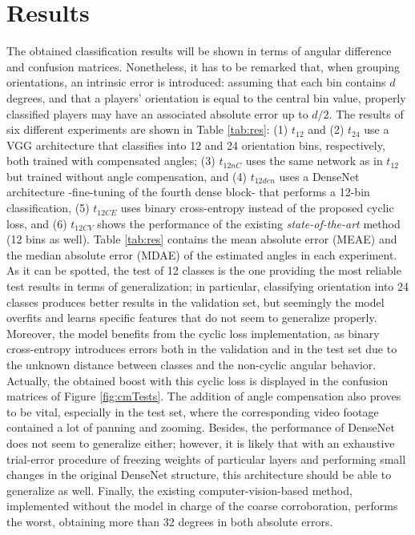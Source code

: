 \documentclass{article}
\newcommand{\gh}[2]{{\sout{#1}}{\color{blue}#2}}
\begin{document}
\section{Results} \label{sec:res}
The obtained classification results will be shown in terms of angular difference and confusion matrices. Nonetheless, it has to be remarked that, when grouping orientations, an intrinsic error is introduced: assuming that each bin contains $d$ degrees, and that a players' orientation is equal to the central bin value, properly classified players may have an associated absolute error up to $d/2$. %
The results of six different experiments are shown in Table \ref{tab:res}: (1) $t_{12}$ and (2) $t_{24}$ use a VGG architecture that classifies into 12 and 24 orientation bins, respectively, both trained with compensated angles; (3) $t_{12nC}$ uses the same network as in $t_{12}$ but trained without angle compensation, and (4) $t_{12den}$ uses a DenseNet architecture -fine-tuning of the fourth dense block- that performs a 12-bin classification, (5) $t_{12CE}$ uses binary cross-entropy instead of the proposed cyclic loss, and (6) $t_{12CV}$ shows the performance of the existing \textit{state-of-the-art} method \cite{arbues2020always} (12 bins as well).  %
Table \ref{tab:res} contains the mean absolute error (MEAE) and the median absolute error (MDAE) of the estimated angles in each experiment. As it can be spotted, the test of 12 classes is the one providing the most reliable test results in terms of generalization; in particular, classifying orientation into 24 classes produces better results in the validation set, but seemingly the model overfits and learns specific features that do not seem to generalize properly. Moreover, the model benefits from the cyclic loss implementation, as binary cross-entropy introduces errors both in the validation and in the test set due to the unknown distance between classes and the non-cyclic angular behavior.  Actually, the obtained boost with this cyclic loss is displayed in the confusion matrices of Figure \ref{fig:cmTests}. The addition of angle compensation also proves to be vital, especially in the test set, where the corresponding video footage contained a lot of panning and zooming. Besides, the performance of DenseNet does not seem to generalize either; however, it is likely that with an exhaustive trial-error procedure of freezing weights of particular layers and performing small changes in the original DenseNet structure, this architecture should be able to generalize as well. Finally, the existing computer-vision-based method, implemented without the model in charge of the coarse corroboration, performs the worst, obtaining more than 32 degrees in both absolute errors. 
\end{document}
